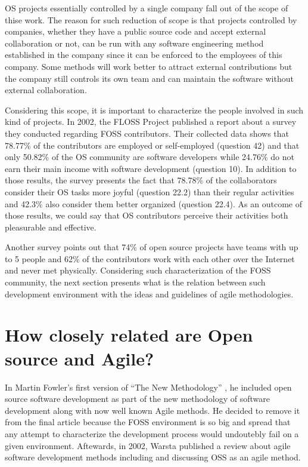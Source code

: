 \documentclass[lnbip]{svmultln}
\begin{document}
OS projects essentially controlled by a single company fall out of the
scope of thise work. The reason for such reduction of scope is that
projects controlled by companies, whether they have a public source
code and accept external collaboration or not, can be run with any
software engineering method established in the company since it can be
enforced to the employees of this company. Some methods will work
better to attract external contributions but the company still
controls its own team and can maintain the software without external
collaboration.

Considering this scope, it is important to characterize the people
involved in such kind of projects. In 2002, the FLOSS Project
\cite{url:flossproject} published a report about a survey they
conducted regarding FOSS contributors. Their collected data
\cite{url:flossdata} shows that 78.77\% of the contributors are
employed or self-employed (question 42) and that only 50.82\% of the
OS community are software developers while 24.76\% do not earn their
main income with software development (question 10).  In addition to
those results, the survey presents the fact that 78.78\% of the
collaborators consider their OS tasks more joyful (question 22.2) than
their regular activities and 42.3\% also consider them better
organized (question 22.4). As an outcome of those results, we could
say that OS contributors perceive their activities both pleasurable
and effective.


Another survey \cite{reis2003} points out that 74\% of open source
projects have teams with up to 5 people and 62\% of the contributors
work with each other over the Internet and never met
physically. Considering such characterization of the FOSS community,
the next section presents what is the relation between such
development environment with the ideas and guidelines of agile
methodologies.

\section{How closely related are Open source and Agile?}
\label{sec:relation}

In Martin Fowler's first version of ``The New Methodology''
\cite{url:fowler2000orig}, he included open source software
development as part of the new methodology of software development
along with now well known Agile methods. He decided to remove it from
the final article because the FOSS environment is so big and spread
that any attempt to characterize the development process would
undoutebly fail on a given environment. Aftewards, in 2002, Warsta
\cite{Warsta2002} published a review about agile software development
methods including and discussing OSS as an agile method.
\end{document}
